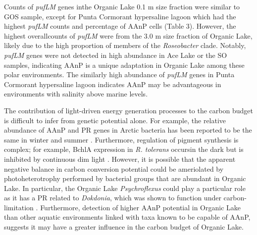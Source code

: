 Counts of \emph{pufLM} genes inthe Organic Lake 0.1 \textmu{}m size fraction were similar to \ac{GOS} sample, except for Punta Cormorant hypersaline lagoon which had the highest \emph{pufLM} counts and percentage of \ac{AAnP} cells (Table 3). 
However, the highest overallcounts of \emph{pufLM} were from the 3.0 \textmu{}m size fraction of Organic Lake, likely due to the high proportion of members of the \emph{Roseobacter} clade. 
Notably, \emph{pufLM} genes were not detected in high abundance in Ace Lake or the \ac{SO} samples, indicating \ac{AAnP} is a unique adaptation in Organic Lake among these polar environments. 
The similarly high abundance of \emph{pufLM} genes in Punta Cormorant hypersaline lagoon indicates \ac{AAnP} may be advantageous in environments with salinity above marine levels.

The contribution of light-driven energy generation processes to the carbon budget is difficult to infer from genetic potential alone. 
For example, the relative abundance of \ac{AAnP} and \ac{PR} genes in Arctic bacteria has been reported to be the same in winter and summer \cite{Cottrell2009}. 
Furthermore, regulation of pigment synthesis is complex; for example, \ac{BchlA} expression in \emph{R. tolerans} occursin the dark but is inhibited by continuous dim light \cite{Labrenz1999}. 
However, it is possible that the apparent negative balance in carbon conversion potential could be ameriolated by photoheterotrophy performed by bacterial groups that are abundant in Organic Lake. 
In particular, the Organic Lake \emph{Psychroflexus} could play a particular role as it has a \ac{PR} related to \emph{Dokdonia}, which was shown to function under carbon-limitation \cite{Gomez-Consarnau2007}.
Furthermore, detection of higher \ac{AAnP} potential in Organic Lake than other aquatic environments linked with taxa known to be capable of \ac{AAnP}, suggests it may have a greater influence in the carbon budget of Organic Lake.

